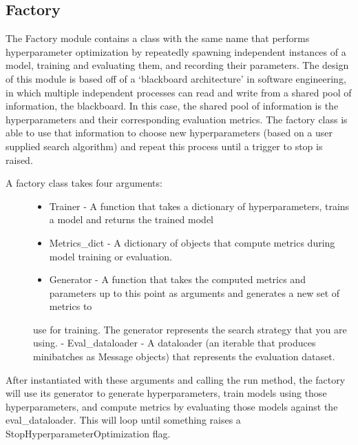 \documentclass[letterpaper,10pt,english]{sphinxmanual}
\begin{document}
\subsection{Factory}
\label{\detokenize{Fireworks:factory}}
The Factory module contains a class with the same name that performs hyperparameter optimization by repeatedly spawning independent instances
of a model, training and evaluating them, and recording their parameters. The design of this module is based off of a ‘blackboard architecture’
in software engineering, in which multiple independent processes can read and write from a shared pool of information, the blackboard. In this
case, the shared pool of information is the hyperparameters and their corresponding evaluation metrics. The factory class is able to use that
information to choose new hyperparameters (based on a user supplied search algorithm) and repeat this process until a trigger to stop is raised.
\begin{description}
\item[{A factory class takes four arguments:}] \leavevmode\begin{itemize}
\item {} 
Trainer - A function that takes a dictionary of hyperparameters,  trains a model and returns the trained model

\item {} 
Metrics\_dict - A dictionary of objects that compute metrics during model training or evaluation.

\item {} 
Generator - A function that takes the computed metrics and parameters up to this point as arguments and generates a new set of metrics to

\end{itemize}

use for training. The generator represents the search strategy that you are using.
- Eval\_dataloader - A dataloader (an iterable that produces minibatches as Message objects) that represents the evaluation dataset.

\end{description}

After instantiated with these arguments and calling the run method, the factory will use its generator to generate hyperparameters, train
models using those hyperparameters, and compute metrics by evaluating those models against the eval\_dataloader. This will loop until something
raises a StopHyperparameterOptimization flag.
\end{document}

